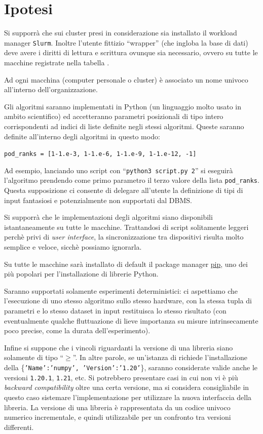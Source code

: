 \documentclass{article}
\begin{document}
\section{Ipotesi}
\label{sec:ipotesi}
Si supporrà che sui cluster presi in considerazione sia installato il workload manager \texttt{Slurm}. Inoltre l'utente fittizio ``wrapper'' (che ingloba la base di dati) deve avere i diritti di lettura e scrittura ovunque sia necessario, ovvero su tutte le macchine registrate nella tabella .

Ad ogni macchina (computer personale o cluster) è associato un nome univoco all'interno dell'organizzazione.

Gli algoritmi saranno implementati in Python (un linguaggio molto usato in ambito scientifico) ed accetteranno parametri posizionali di tipo intero corrispondenti ad indici di liste definite negli stessi algoritmi. Queste saranno definite all'interno degli algoritmi in questo modo:

\verb|pod_ranks = [1-1.e-3, 1-1.e-6, 1-1.e-9, 1-1.e-12, -1]|

Ad esempio, lanciando uno script con ``\texttt{python3 script.py 2}'' si eseguirà l'algoritmo prendendo come primo parametro il terzo valore della lista \texttt{pod\_ranks}. Questa supposizione ci consente di delegare all'utente la definizione di tipi di input fantasiosi e potenzialmente non supportati dal DBMS.

Si supporrà che le implementazioni degli algoritmi siano disponibili istantaneamente su tutte le macchine. Trattandosi di script solitamente leggeri perchè privi di \emph{user interface}, la sincronizzazione tra dispositivi risulta molto semplice e veloce, sicchè possiamo ignorarla.

Su tutte le macchine sarà installato di default il package manager \href{https://pypi.org/project/pip/}{pip}, uno dei più popolari per l'installazione di librerie Python.

Saranno supportati solamente esperimenti deterministici: ci aspettiamo che l'esecuzione di uno stesso algoritmo sullo stesso hardware, con la stessa tupla di parametri e lo stesso dataset in input restituisca lo stesso risultato (con eventualmente qualche fluttuazione di lieve importanza su misure intrinsecamente poco precise, come la durata dell'esperimento).

Infine si suppone che i vincoli riguardanti la versione di una libreria siano solamente di tipo ``$\geq$''. In altre parole, se un'istanza di  richiede l'installazione della  \{\texttt{'Name':'numpy', 'Version':'1.20'}\}, saranno considerate valide anche le versioni \texttt{1.20.1}, \texttt{1.21}, etc. Si potrebbero presentare casi in cui non vi è più \emph{backward compatibility} oltre una certa versione, ma si considera consigliabile in questo caso sistemare l'implementazione per utilizzare la nuova interfaccia della libreria. La versione di una libreria è rappresentata da un codice univoco numerico incrementale, e quindi utilizzabile per un confronto tra versioni differenti.
\end{document}
